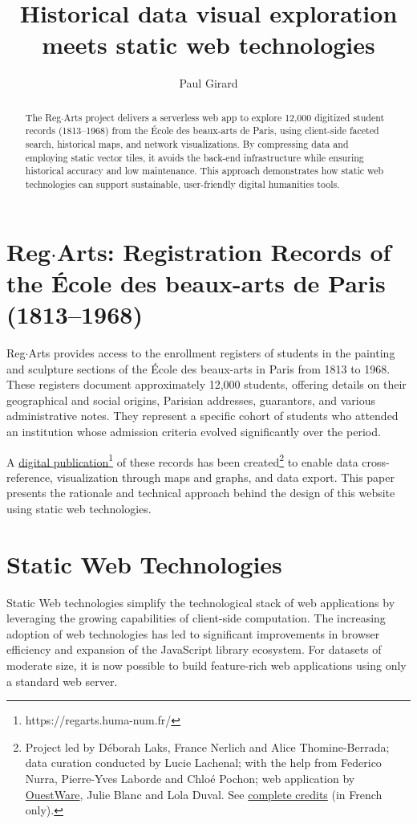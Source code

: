 \documentclass[final]{anthology-ch} %
\title{Historical data visual exploration meets static web technologies}
\author[1]{Paul Girard}[
  orcid=0000-0001-9332-3308
]
\affiliation{1}{OuestWare, Nantes, France}
\begin{document}
\maketitle
\begin{abstract}
The Reg$\cdot$Arts project delivers a serverless web app to explore 12,000 digitized student records (1813–1968) from the École des beaux-arts de Paris, using client-side faceted search, historical maps, and network visualizations. By compressing data and employing static vector tiles, it avoids the back-end infrastructure while ensuring historical accuracy and low maintenance. This approach demonstrates how static web technologies can support sustainable, user-friendly digital humanities tools.
\end{abstract}

\section{Reg$\cdot$Arts: Registration Records of the École des beaux-arts de Paris (1813--1968)}
Reg$\cdot$Arts provides access to the enrollment registers of students in the painting and sculpture sections of the École des beaux-arts in Paris from 1813 to 1968. These registers document approximately 12,000 students, offering details on their geographical and social origins, Parisian addresses, guarantors, and various administrative notes. They represent a specific cohort of students who attended an institution whose admission criteria evolved significantly over the period.

A \href{https://regarts.huma-num.fr/}{digital publication}\footnote{https://regarts.huma-num.fr/} of these records has been created\footnote{Project led by Déborah Laks, France Nerlich and Alice Thomine-Berrada; data curation conducted by Lucie Lachenal; with the help from Federico Nurra, Pierre-Yves Laborde and Chloé Pochon; web application by \href{https://ouestware.com}{OuestWare}, Julie Blanc and Lola Duval. See \href{https://regarts.huma-num.fr/a-propos\#lequipe}{complete credits} (in French only).} to enable data cross-reference, visualization through maps and graphs, and data export. This paper presents the rationale and technical approach behind the design of this website using static web technologies.

\section{Static Web Technologies}
Static Web technologies simplify the technological stack of web applications by leveraging the growing capabilities of client-side computation. The increasing adoption of web technologies has led to significant improvements in browser efficiency and expansion of the JavaScript library ecosystem. For datasets of moderate size, it is now possible to build feature-rich web applications using only a standard web server.
\end{document}
